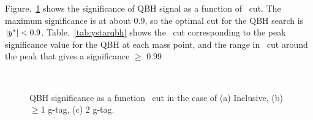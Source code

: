 Figure.~\ref{fig: qbh significance as a function of y* cut} shows the significance of QBH signal as a function of \ystar\ cut. The maximum significance is at about 0.9, so the optimal cut for the QBH search is $|y^\ast| < 0.9$. Table.~\ref{tab:ystarqbh} shows the \ystar\ cut corresponding to the peak significance value for the QBH at each mass point, and the range in \ystar\ cut around the peak that gives a significance $\geq$ 0.99
\begin{figure}[!htb]
        \centering
        \\
        \caption{QBH significance as a function \ystar\ cut in the case of (a) Inclusive, (b) $\geq$1 g-tag, (c) 2 g-tag.}
        \label{fig: qbh significance as a function of y* cut}
\end{figure}


